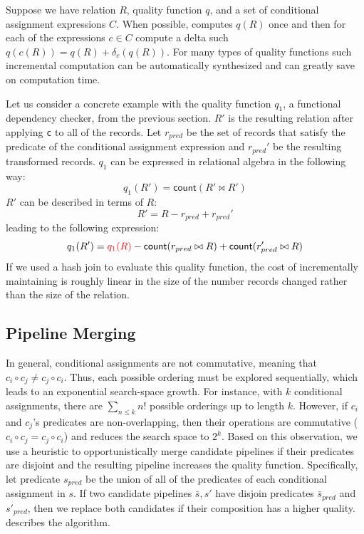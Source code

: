 Suppose we have relation $R$, quality function $q$, and a set of conditional assignment expressions $C$.  When possible, \sys computes $q(R)$ once and then for each of the expressions $c \in C$ compute a delta such $q(c(R)) = q(R) + \delta_c(q(R))$.
For many types of quality functions such incremental computation can be automatically synthesized and can greatly save on computation time.

Let us consider a concrete example with the quality function $q_1$, a functional dependency checker, from the previous section.
$R'$ is the resulting relation after applying \texttt{c} to all of the records.
Let $r_{pred}$ be the set of records that satisfy the predicate of the conditional assignment expression and $r_{pred}'$ be the resulting transformed records.
$q_1$ can be expressed in relational algebra in the following way:
\[
q_1(R') = \textsf{count}( R' \bowtie R' )
\]
$R'$ can be described in terms of $R$:
\[
R' = R - r_{pred} + r_{pred}' 
\]
leading to the following expression:
\[
q_1(R') = \textcolor{red}{q_1(R)} - \textsf{count}( r_{pred} \bowtie R )  + \textsf{count}( r'_{pred} \bowtie R )
\]
If we used a hash join to evaluate this quality function, the cost of incrementally maintaining is roughly linear in the size of the number records changed rather than the size of the relation.







\subsection{Pipeline Merging}
In general, conditional assignments are not commutative, meaning that $c_i\circ c_j \ne c_j\circ c_i$.  Thus, each possible ordering must be explored sequentially, which leads to an exponential search-space growth.  For instance, with $k$ conditional assignments, there are $\sum_{n\le k} n!$ possible orderings up to length $k$.  However, if $c_i$ and $c_j$'s predicates are non-overlapping, then their operations are commutative ($c_i\circ c_j = c_j\circ c_i$) and reduces the search space to $2^k$.  Based on this observation, we use a heuristic to opportunistically merge candidate pipelines if their predicates are disjoint and the resulting pipeline increases the quality function.  Specifically, let predicate $s_{pred}$ be the union of all of the predicates of each conditional assignment in $s$.  If two candidate pipelines $\bar{s},s'$ have disjoin predicates $\bar{s}_{pred}$ and $s'_{pred}$, then we replace both candidates if their composition has a higher quality.   describes the algorithm.


